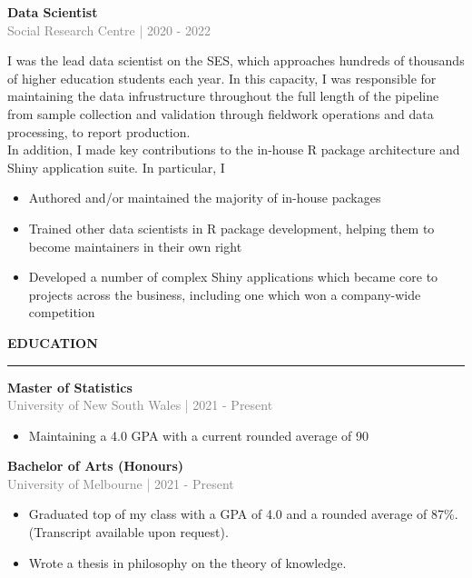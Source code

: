 \documentclass[12pt]{article}
\begin{document}
\vspace{0.5cm}
{\bf Data Scientist} \\
\textcolor{gray}{Social Research Centre | 2020 - 2022} \\[3pt]
\begin{small}
I was the lead data scientist on the SES, which approaches hundreds of thousands of higher education students each year. In this capacity, I was responsible for maintaining the data infrustructure throughout the full length of the pipeline from sample collection and validation through fieldwork operations and data processing, to report production.
\\

In addition, I made key contributions to the in-house R package architecture and Shiny application suite. In particular, I

\begin{itemize}
  \item Authored and/or maintained the majority of in-house packages
  \item Trained other data scientists in R package development, helping them to become maintainers in their own right
  \item Developed a number of complex Shiny applications which became core to projects across the business, including one which won a company-wide competition
\end{itemize}
\end{small}

\vspace{1cm}
\begin{large}
{\bf EDUCATION} \\
\textcolor{gray}{\rule{2cm}{2mm}}
\end{large}
\vspace{5pt}

{\bf Master of Statistics} \\
\textcolor{gray}{University of New South Wales | 2021 - Present}
\begin{small}
\begin{itemize}
  \item Maintaining a 4.0 GPA with a current rounded average of 90%
\end{itemize}
\end{small}

\vspace{0.5cm}
{\bf Bachelor of Arts (Honours)} \\
\textcolor{gray}{University of Melbourne | 2021 - Present}
\begin{small}
\begin{itemize}
  \item Graduated top of my class with a GPA of 4.0 and a rounded average of 87\%. (Transcript available upon request).
  \item Wrote a thesis in philosophy on the theory of knowledge.
\end{itemize}
\end{small}
\end{document}
